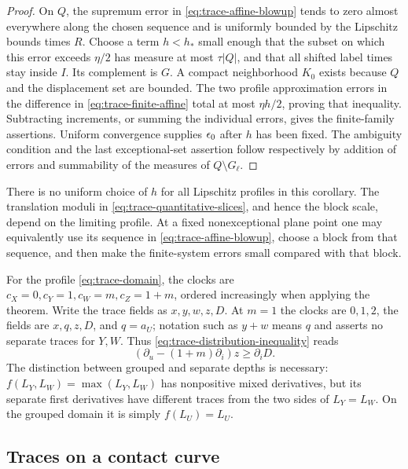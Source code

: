 \begin{proof}
On $Q$, the supremum error in \eqref{eq:trace-affine-blowup} tends to
zero almost everywhere along the chosen sequence and is uniformly
bounded by the Lipschitz bounds times $R$.  Choose a term $h<h_*$
small enough that the subset on which this error exceeds $\eta/2$
has measure at most $\tau|Q|$, and that all shifted label times stay
inside $I$.  Its complement is $G$.  A compact neighborhood $K_0$
exists because $Q$ and the displacement set are bounded.  The two
profile approximation errors in the difference in
\eqref{eq:trace-finite-affine} total at most $\eta h/2$, proving that
inequality.  Subtracting increments, or summing the individual errors,
gives the finite-family assertions.  Uniform convergence supplies
$\epsilon_0$ after $h$ has been fixed.  The ambiguity condition and the
last exceptional-set assertion follow respectively by addition of
errors and summability of the measures of $Q\setminus G_\ell$.
\end{proof}

There is no uniform choice of $h$ for all Lipschitz profiles in this
corollary.  The translation moduli in
\eqref{eq:trace-quantitative-slices}, and hence the block scale, depend
on the limiting profile.  At a fixed nonexceptional plane point one
may equivalently use its sequence in
\eqref{eq:trace-affine-blowup}, choose a block from that sequence, and
then make the finite-system errors small compared with that block.

For the profile \eqref{eq:trace-domain}, the clocks are
$c_X=0,c_Y=1,c_W=m,c_Z=1+m$, ordered increasingly when applying the
theorem.  Write the trace fields as $x,y,w,z,D$.  At $m=1$ the clocks
are $0,1,2$, the fields are $x,q,z,D$, and $q=a_U$; notation such as
$y+w$ means $q$ and asserts no separate traces for $Y,W$.
Thus \eqref{eq:trace-distribution-inequality} reads
\begin{equation}\label{eq:trace-z-D}
 (\partial_u-(1+m)\partial_i)z\ge\partial_iD.
\end{equation}
The distinction between grouped and separate depths is necessary:
$f(L_Y,L_W)=\max(L_Y,L_W)$ has nonpositive mixed derivatives, but its
separate first derivatives have different traces from the two sides
of $L_Y=L_W$.  On the grouped domain it is simply $f(L_U)=L_U$.

\subsection{Traces on a contact curve}

